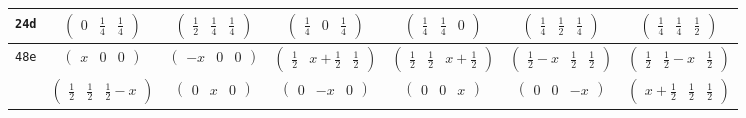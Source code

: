 \documentclass[fleqn,9pt,landscape]{jsarticle}
\begin{document}
\begin{center}
\begin{longtable}{ccccccc}
{\tt 24d} & $ \begin{pmatrix} 0 & \frac{1}{4} & \frac{1}{4} \end{pmatrix} $ & $ \begin{pmatrix} \frac{1}{2} & \frac{1}{4} & \frac{1}{4} \end{pmatrix} $ & $ \begin{pmatrix} \frac{1}{4} & 0 & \frac{1}{4} \end{pmatrix} $ & $ \begin{pmatrix} \frac{1}{4} & \frac{1}{4} & 0 \end{pmatrix} $ & $ \begin{pmatrix} \frac{1}{4} & \frac{1}{2} & \frac{1}{4} \end{pmatrix} $ & $ \begin{pmatrix} \frac{1}{4} & \frac{1}{4} & \frac{1}{2} \end{pmatrix} $ \\ \hline
{\tt 48e} & $ \begin{pmatrix} x & 0 & 0 \end{pmatrix} $ & $ \begin{pmatrix} - x & 0 & 0 \end{pmatrix} $ & $ \begin{pmatrix} \frac{1}{2} & x + \frac{1}{2} & \frac{1}{2} \end{pmatrix} $ & $ \begin{pmatrix} \frac{1}{2} & \frac{1}{2} & x + \frac{1}{2} \end{pmatrix} $ & $ \begin{pmatrix} \frac{1}{2} - x & \frac{1}{2} & \frac{1}{2} \end{pmatrix} $ & $ \begin{pmatrix} \frac{1}{2} & \frac{1}{2} - x & \frac{1}{2} \end{pmatrix} $ \\
& $ \begin{pmatrix} \frac{1}{2} & \frac{1}{2} & \frac{1}{2} - x \end{pmatrix} $ & $ \begin{pmatrix} 0 & x & 0 \end{pmatrix} $ & $ \begin{pmatrix} 0 & - x & 0 \end{pmatrix} $ & $ \begin{pmatrix} 0 & 0 & x \end{pmatrix} $ & $ \begin{pmatrix} 0 & 0 & - x \end{pmatrix} $ & $ \begin{pmatrix} x + \frac{1}{2} & \frac{1}{2} & \frac{1}{2} \end{pmatrix} $ \\ \hline

\end{longtable}
\end{center}
\end{document}

